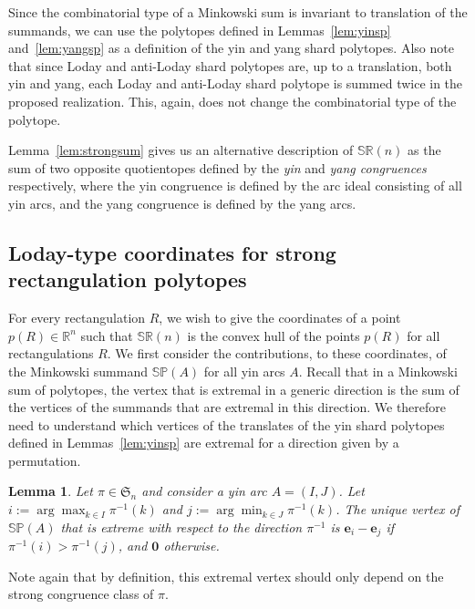 \documentclass{amsart}
\newtheorem{lemma}[theorem]{Lemma}
\theoremstyle{definition}
\newcommand{\R}{\mathbb{R}} %
\newcommand{\f}[1]{\mathfrak{#1}} %
\newcommand{\darkblue}{\color{darkblue}} %
\newcommand{\defn}[1]{\textsl{\darkblue #1}} %
\newcommand{\polytope}[1]{\mathds{#1}} %
\newcommand{\SRP}{\polytope{SR}} %
\newcommand{\SP}{\polytope{SP}}
\begin{document}
Since the combinatorial type of a Minkowski sum is invariant to translation of the summands, we can use the polytopes defined in Lemmas~\ref{lem:yinsp} and~\ref{lem:yangsp} as a definition of the yin and yang shard polytopes.
Also note that since Loday and anti-Loday shard polytopes are, up to a translation, both yin and yang, each Loday and anti-Loday shard polytope is summed twice in the proposed realization.
This, again, does not change the combinatorial type of the polytope.

Lemma~\ref{lem:strongsum} gives us an alternative description of $\SRP(n)$ as the sum of two opposite quotientopes defined by the \defn{yin} and \defn{yang congruences} respectively, where the yin congruence is defined by the arc ideal consisting of all yin arcs, and the yang congruence is defined by the yang arcs.

\subsection{Loday-type coordinates for strong rectangulation polytopes}

For every rectangulation $R$, we wish to give the coordinates of a point $p(R)\in\R^n$ such that $\SRP(n)$ is the convex hull of the points $p(R)$ for all rectangulations $R$.
We first consider the contributions, to these coordinates, of the Minkowski summand $\SP(A)$ for all yin arcs $A$.
Recall that in a Minkowski sum of polytopes, the vertex that is extremal in a generic direction is the sum of the vertices of the summands that are extremal in this direction.
We therefore need to understand which vertices of the translates of the yin shard polytopes defined in Lemmas~\ref{lem:yinsp} are extremal for a direction given by a permutation.

\begin{lemma}
  \label{lem:yinminmax}
  Let $\pi\in\f{S}_n$ and consider a yin arc $A=(I,J)$.
  Let $i := \arg\max_{k\in I} \pi^{-1}(k)$ and $j := \arg\min_{k\in J} \pi^{-1}(k)$.
  The unique vertex of $\SP(A)$ that is extreme with respect to the direction $\pi^{-1}$
  is $\mathbf{e}_i-\mathbf{e}_j$ if $\pi^{-1}(i)>\pi^{-1}(j)$, and $\mathbf{0}$ otherwise.
\end{lemma}

Note again that by definition, this extremal vertex should only depend on the strong congruence class of $\pi$.
\end{document}
